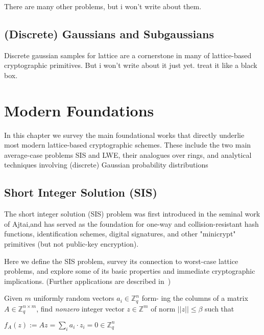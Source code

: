 There are many other problems, but i won't write about them.

\subsection{(Discrete) Gaussians and Subgaussians}
Discrete gaussian samples for  lattice are a cornerstone in many of 
lattice-based cryptographic primitives. But i won't write about it just yet.
treat it like a black box.



\section{Modern Foundations}
In this chapter we survey the main foundational works that directly underlie most modern lattice-based
cryptographic schemes. These include the two main average-case problems SIS and LWE, their analogues
over rings, and analytical techniques involving (discrete) Gaussian probability distributions
\subsection{Short Integer Solution (SIS)}
The short integer solution (SIS) problem was first introduced in the seminal work of Ajtai,and has
served as the foundation for one-way and collision-resistant hash functions, identification schemes, digital
signatures, and other "minicrypt" primitives (but not public-key encryption).

Here we define the SIS problem,
survey its connection to worst-case lattice problems, and explore some of its basic properties and immediate
cryptographic implications. (Further applications are described in~\cite[Chapters 5 and 6]{latticebook})


\begin{definition} \label{def:sis}
    Given $m$ uniformly random vectors $a_i\in \mathbb{Z}_q^n$ form-
ing the columns of a matrix $A\in \mathbb{Z}_q^{n\times m}$, find \emph{nonzero}
integer vector $z\in \mathbb{Z}^m$ of norm $||z|| \le \beta$ such that

$f_A(z):=Az=\sum_{i}{a_i \cdot z_i}=0\in \mathbb{Z}_q^n$
\end{definition}



